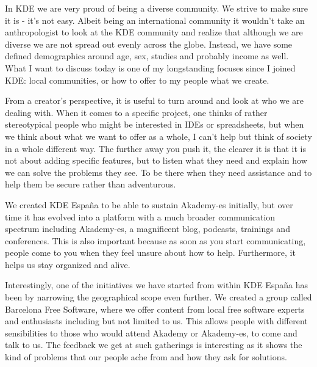 

\noindent{}In KDE we are very proud of being a diverse community. We strive to make sure it is - it's not easy. Albeit being an international community it wouldn't take an anthropologist to look at the KDE community and realize that although we are diverse we are not spread out evenly across the globe. Instead, we have some defined demographics around age, sex, studies and probably income as well. What I want to discuss today is one of my longstanding focuses since I joined KDE: local communities, or how to offer to my people what we create.

From a creator's perspective, it is useful to turn around and look at who we are dealing with. When it comes to a specific project, one thinks of rather stereotypical people who might be interested in IDEs or spreadsheets, but when we think about what we want to offer as a whole, I can't help but think of society in a whole different way. The further away you push it, the clearer it is that it is not about adding specific features, but to listen what they need and explain how we can solve the problems they see. To be there when they need assistance and to help them be secure rather than adventurous.

We created KDE Espa\~{n}a to be able to sustain Akademy-es initially, but over time it has evolved into a platform with a much broader communication spectrum including Akademy-es, a magnificent blog, podcasts, trainings and conferences. This is also important because as soon as you start communicating, people come to you when they feel unsure about how to help. Furthermore, it helps us stay organized and alive.

Interestingly, one of the initiatives we have started from within KDE Espa\~{n}a has been by narrowing the geographical scope even further. We created a group called Barcelona Free Software, where we offer content from local free software experts and enthusiasts including but not limited to us. This allows people with different sensibilities to those who would attend Akademy or Akademy-es, to come and talk to us. The feedback we get at such gatherings is interesting as it shows the kind of problems that our people ache from and how they ask for solutions.

